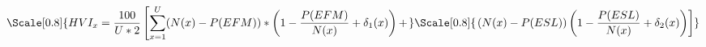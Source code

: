 


\begin{equation} \nonumber
    \label{eq:eq1}
 \Scale[0.8]{HVI_x = \frac{100}{U*2}\left[ \sum_{x=1}^U(N(x)-P(E F M)) *\left(1-\frac{P(E F M)}{N(x)}+\delta_1(x)\right)+ \right.} \\
\Scale[0.8]{\left. (N(x)-P(E S L))\left(1-\frac{P(E S L)}{N(x)}+\delta_2(x)\right)\right]}
\end{equation}